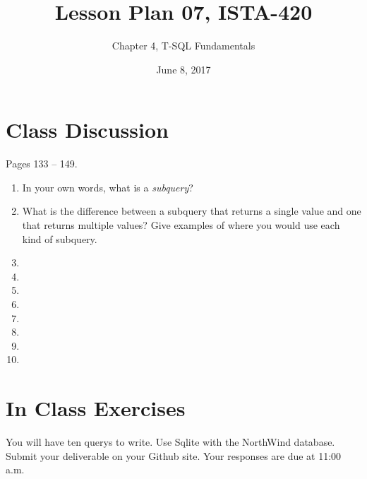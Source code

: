 \documentclass{article}
\title{Lesson Plan 07, ISTA-420}
\author{Chapter 4, T-SQL Fundamentals}
\date{June 8, 2017}
\begin{document}
    

    \maketitle{}

    \section{Class Discussion}

    Pages 133 -- 149.

    \begin{enumerate}
        \item In your own words, what is a \textit{subquery}?
        \item What is the difference between a subquery that returns a single value and one that returns multiple values? Give examples of where you would use each kind of subquery. 
        \item 
        \item 
        \item 
        \item 
        \item 
        \item 
        \item 
        \item 
    \end{enumerate}

    \section{In Class Exercises}

You will have ten querys to write. Use Sqlite with the NorthWind database. Submit your deliverable on your Github site. Your responses are due at 11:00 a.m.

\end{document}
